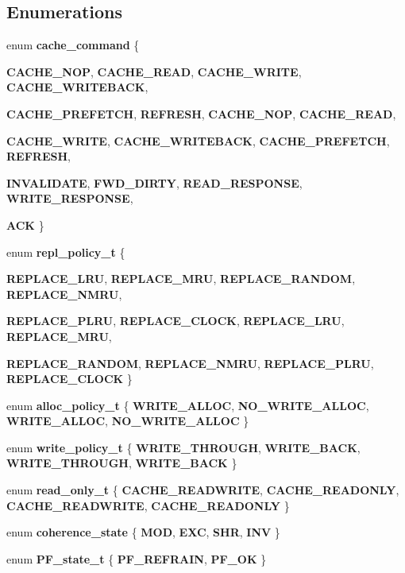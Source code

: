 \subsection*{Enumerations}
\begin{CompactItemize}
\item 
enum {\bf cache\_\-command} \{ \par
{\bf CACHE\_\-NOP}, 
{\bf CACHE\_\-READ}, 
{\bf CACHE\_\-WRITE}, 
{\bf CACHE\_\-WRITEBACK}, 
\par
{\bf CACHE\_\-PREFETCH}, 
{\bf REFRESH}, 
{\bf CACHE\_\-NOP}, 
{\bf CACHE\_\-READ}, 
\par
{\bf CACHE\_\-WRITE}, 
{\bf CACHE\_\-WRITEBACK}, 
{\bf CACHE\_\-PREFETCH}, 
{\bf REFRESH}, 
\par
{\bf INVALIDATE}, 
{\bf FWD\_\-DIRTY}, 
{\bf READ\_\-RESPONSE}, 
{\bf WRITE\_\-RESPONSE}, 
\par
{\bf ACK}
 \}
\item 
enum {\bf repl\_\-policy\_\-t} \{ \par
{\bf REPLACE\_\-LRU}, 
{\bf REPLACE\_\-MRU}, 
{\bf REPLACE\_\-RANDOM}, 
{\bf REPLACE\_\-NMRU}, 
\par
{\bf REPLACE\_\-PLRU}, 
{\bf REPLACE\_\-CLOCK}, 
{\bf REPLACE\_\-LRU}, 
{\bf REPLACE\_\-MRU}, 
\par
{\bf REPLACE\_\-RANDOM}, 
{\bf REPLACE\_\-NMRU}, 
{\bf REPLACE\_\-PLRU}, 
{\bf REPLACE\_\-CLOCK}
 \}
\item 
enum {\bf alloc\_\-policy\_\-t} \{ {\bf WRITE\_\-ALLOC}, 
{\bf NO\_\-WRITE\_\-ALLOC}, 
{\bf WRITE\_\-ALLOC}, 
{\bf NO\_\-WRITE\_\-ALLOC}
 \}
\item 
enum {\bf write\_\-policy\_\-t} \{ {\bf WRITE\_\-THROUGH}, 
{\bf WRITE\_\-BACK}, 
{\bf WRITE\_\-THROUGH}, 
{\bf WRITE\_\-BACK}
 \}
\item 
enum {\bf read\_\-only\_\-t} \{ {\bf CACHE\_\-READWRITE}, 
{\bf CACHE\_\-READONLY}, 
{\bf CACHE\_\-READWRITE}, 
{\bf CACHE\_\-READONLY}
 \}
\item 
enum {\bf coherence\_\-state} \{ {\bf MOD}, 
{\bf EXC}, 
{\bf SHR}, 
{\bf INV}
 \}
\item 
enum {\bf PF\_\-state\_\-t} \{ {\bf PF\_\-REFRAIN}, 
{\bf PF\_\-OK}
 \}
\end{CompactItemize}
